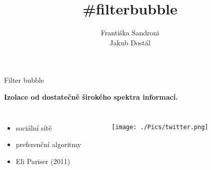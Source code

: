 \documentclass[notheorems,12pt]{beamer}
\title[]{\#filterbubble}
\date{}
\author{Františka Sandroni\\
        Jakub Dostál}
\institute{}
\begin{document}
\maketitle
\begin{frame}{Filter bubble}
    \center
    \vspace{-0.1cm}
    \begin{large}\textbf{Izolace od dostatečně širokého spektra informací.}\end{large}
    \vspace{0.8cm}
    \begin{columns}
    \column{5cm}
    \begin{itemize}
        \item sociální sítě
        \item preferenční algoritmy
        \item Eli Pariser (2011)
    \end{itemize}
    \column{6cm}
        \begin{figure}
            \centering
            \texttt{[image: ./Pics/twitter.png]}
        \end{figure}
    \end{columns}
\end{frame}
\end{document}
